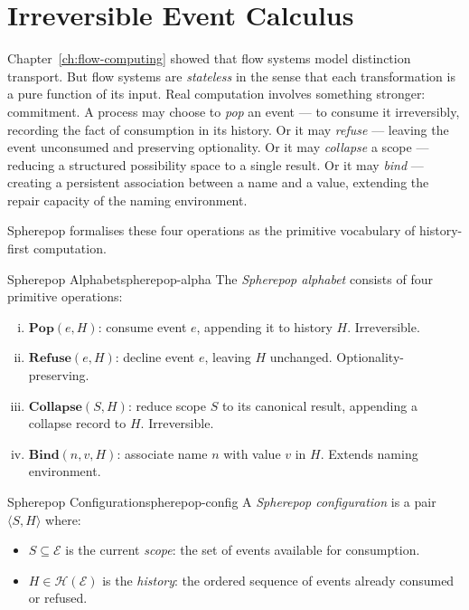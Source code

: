 \documentclass[12pt,twoside,openright]{book}
\newcommand{\hist}{\mathcal{H}}
\begin{document}
\section{Irreversible Event Calculus}

Chapter~\ref{ch:flow-computing} showed that flow systems
model distinction transport. But flow systems are
\emph{stateless} in the sense that each transformation is
a pure function of its input. Real computation involves
something stronger: commitment. A process may choose to
\emph{pop} an event — to consume it irreversibly,
recording the fact of consumption in its history. Or it
may \emph{refuse} — leaving the event unconsumed and
preserving optionality. Or it may \emph{collapse} a scope
— reducing a structured possibility space to a single
result. Or it may \emph{bind} — creating a persistent
association between a name and a value, extending the
repair capacity of the naming environment.

Spherepop formalises these four operations as the
primitive vocabulary of history-first computation.

\begin{definition}{Spherepop Alphabet}{spherepop-alpha}
  The \emph{Spherepop alphabet} consists of four
  primitive operations:
  \begin{enumerate}[(i)]
    \item $\mathbf{Pop}(e, H)$: consume event $e$,
          appending it to history $H$. Irreversible.
    \item $\mathbf{Refuse}(e, H)$: decline event $e$,
          leaving $H$ unchanged. Optionality-preserving.
    \item $\mathbf{Collapse}(S, H)$: reduce scope $S$
          to its canonical result, appending a
          collapse record to $H$. Irreversible.
    \item $\mathbf{Bind}(n, v, H)$: associate name $n$
          with value $v$ in $H$. Extends naming
          environment.
  \end{enumerate}
\end{definition}

\begin{definition}{Spherepop Configuration}{spherepop-config}
  A \emph{Spherepop configuration} is a pair
  $\langle S, H \rangle$ where:
  \begin{itemize}[nosep]
    \item $S \subseteq \mathcal{E}$ is the current
          \emph{scope}: the set of events available
          for consumption.
    \item $H \in \hist(\mathcal{E})$ is the
          \emph{history}: the ordered sequence of
          events already consumed or refused.
  \end{itemize}
\end{definition}
\end{document}
